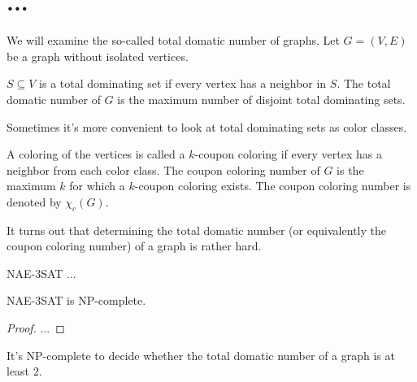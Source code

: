\section{...}

We will examine the so-called total domatic number of graphs.
Let $G = (V, E)$ be a graph without isolated vertices.

\begin{definition}
  $S \subseteq V$ is a total dominating set if every vertex has a neighbor in
  $S$. The total domatic number of $G$ is the maximum number of disjoint total
  dominating sets.
\end{definition}

Sometimes it's more convenient to look at total dominating sets as color classes.

\begin{definition}
  A coloring of the vertices is called a $k$-coupon coloring if every vertex
  has a neighbor from each color class. The coupon coloring number of $G$ is
  the maximum $k$ for which a $k$-coupon coloring exists. The coupon coloring
  number is denoted by $\chi_c(G)$.
\end{definition}

It turns out that determining the total domatic number (or equivalently the
coupon coloring number) of a graph is rather hard.

\begin{definition}
  NAE-3SAT ...
\end{definition}

\begin{thm}
  NAE-3SAT is NP-complete.
\end{thm}

\begin{proof}
  ...
\end{proof}

\begin{thm}
  It's NP-complete to decide whether the total domatic number of
  a graph is at least $2$.
\end{thm}

